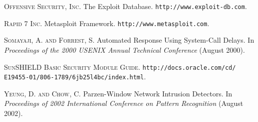 \documentclass[10pt,twocolumn]{article}
\begin{document}
\begin{thebibliography}{99}
\textsc{Offensive Security, Inc.} The Exploit Database. {\tt http://www.exploit-db.com}.

\textsc{Rapid 7 Inc.} Metasploit Framework. {\tt http://www.metasploit.com}.

\textsc{Somayaji, A. and Forrest, S.} Automated Response Using System-Call Delays. In {\em Proceedings of the 2000 USENIX Annual Technical Conference} (August 2000).

\textsc{SunSHIELD Basic Security Module Guide.} {\tt http://docs.oracle.com/cd/\\E19455-01/806-1789/6jb25l4bc/index.html}.

\textsc{Yeung, D. and Chow, C.} Parzen-Window Network Intrusion Detectors. In {\em Proceedings of 2002 International Conference on Pattern Recognition} (August 2002).

\end{thebibliography}
\end{document}
